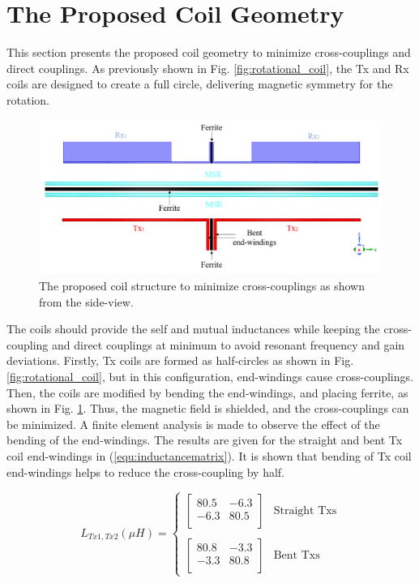\documentclass[journal]{IEEEtran}
\begin{document}
\section{The Proposed Coil Geometry }
This section presents the proposed coil geometry to minimize cross-couplings and direct couplings. As previously shown in Fig. \ref{fig:rotational_coil}, the Tx and Rx coils are designed to create a full circle, delivering magnetic symmetry for the rotation.
\begin{figure}[h]
    \centering
    \includegraphics[width=1\linewidth]{CoilStructure3.png}
    \caption{The proposed coil structure to minimize cross-couplings as shown from the side-view.}
    \label{fig:coil_structure}
\end{figure}

The coils should provide the self and mutual inductances while keeping the cross-coupling and direct couplings at minimum to avoid resonant frequency and gain deviations.
Firstly, Tx coils are formed as half-circles as shown in Fig. \ref{fig:rotational_coil}, but in this configuration, end-windings cause cross-couplings. 
Then, the coils are modified by bending the end-windings, and placing ferrite, as shown in Fig. \ref{fig:coil_structure}.
Thus, the magnetic field is shielded, and the cross-couplings can be minimized. 
A finite element analysis is made to observe the effect of the bending of the end-windings. The results are given for the straight and bent Tx coil end-windings in  (\ref{equ:inductancematrix}). 
It is shown that bending of Tx coil end-windings helps to reduce the cross-coupling by half.

\begin{equation}
    \label{equ:inductancematrix}
    L_{Tx1,Tx2}(\mu H)= 
    \begin{cases}
        \begin{bmatrix}
        80.5 & -6.3\\
        -6.3 & 80.5 \\
        \end{bmatrix}  & \text{Straight Txs}  \\
        \\
        \begin{bmatrix}
        80.8 & -3.3 \\
        -3.3 & 80.8 \\
        \end{bmatrix}  & \text{Bent Txs}
    \end{cases}
\end{equation} 
\end{document}
